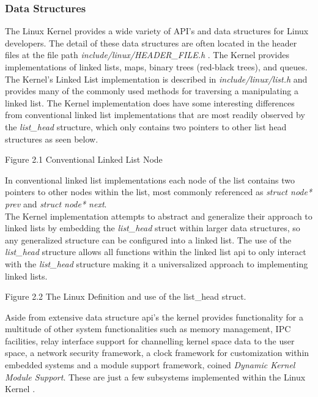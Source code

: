    \subsubsection{\bf Data Structures}
      \normalfont \indent The Linux Kernel provides a wide variety of API’s and data structures for Linux developers. The detail of these data structures are often located in the header files at the file path \textit{include/linux/HEADER\_FILE.h} \cite{linuxProgInterface2010}. The Kernel provides implementations of linked lists, maps, binary trees (red-black trees), and queues. The Kernel’s Linked List implementation is described in \textit{include/linux/list.h} and provides many of the commonly used methods for traversing a manipulating a linked list. The Kernel implementation does have some interesting differences from conventional linked list implementations that are most readily observed by the \textit{list\_head} structure, which only contains two pointers to other list head structures as seen below.\\ 

        
\begin{center}
Figure 2.1 Conventional Linked List Node 
\end{center}

	\normalfont \indent In conventional linked list implementations each node of the list contains two pointers to other nodes within the list, most commonly referenced as \textit{struct node* prev} and \textit{struct node* next}.\\
	
	\normalfont \indent The Kernel implementation attempts to abstract and generalize their approach to linked lists by embedding the \textit{list\_head} struct within larger data structures, so any generalized structure can be configured into a linked list. The use of the \textit{list\_head} structure allows all functions within the linked list api to only interact with the \textit{list\_head} structure making it a universalized approach to implementing linked lists. \\

        
\begin{center}
Figure 2.2 The Linux Definition and use of the list\_head struct. 
\end{center}


	\normalfont \indent Aside from extensive data structure api’s the kernel provides functionality for a multitude of other system functionalities such as memory management, IPC facilities, relay interface support for channelling kernel space data to the user space, a network security framework, a clock framework for customization within embedded systems and a module support framework, coined \textit{Dynamic Kernel Module Support}. These are just a few subsystems implemented within the Linux Kernel \cite{linuxProgInterface2010}.\\


